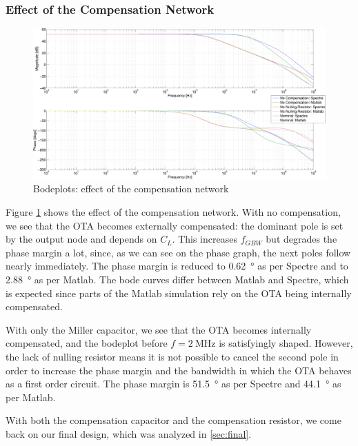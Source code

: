 \documentclass[english,10pt]{article}
\begin{document}
\subsubsection{Effect of the Compensation Network}
\begin{figure}[htbp]
  \centering
  \includegraphics[width = \textwidth]{6_2.pdf}
  \caption{Bodeplots: effect of the compensation network\label{fig:comp}}
\end{figure}
Figure \ref{fig:comp} shows the effect of the compensation network. With no compensation, we see that the OTA becomes externally compensated: the dominant pole is set by the output node and depends on $C_L$. This increases $f_{GBW}$ but degrades the phase margin a lot, since, as we can see on the phase graph, the next poles follow nearly immediately. The phase margin is reduced to \SI{0.62}{\degree} as per Spectre and to \SI{2.88}{\degree} as per Matlab. The bode curves differ between Matlab and Spectre, which is expected since parts of the Matlab simulation rely on the OTA being internally compensated.

With only the Miller capacitor, we see that the OTA becomes internally compensated, and the bodeplot before $f = \SI{2}{\mega\hertz}$ is satisfyingly shaped. However, the lack of nulling resistor means it is not possible to cancel the second pole in order to increase the phase margin and the bandwidth in which the OTA behaves as a first order circuit. The phase margin is \SI{51.5}{\degree} as per Spectre and \SI{44.1}{\degree} as per Matlab.

With both the compensation capacitor and the compensation resistor, we come back on our final design, which was analyzed in \ref{sec:final}.
\end{document}
